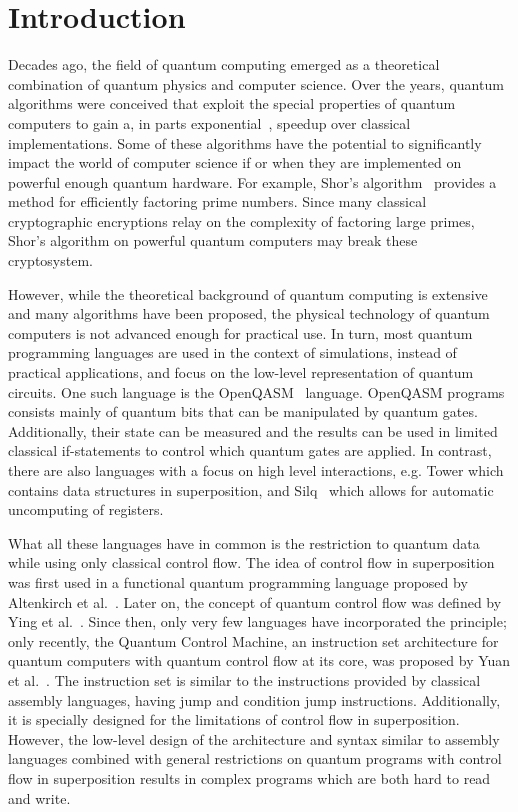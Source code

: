 \chapter{Introduction}
\label{ch:introduction}
Decades ago, the field of quantum computing emerged as a theoretical combination of quantum physics and computer science. Over the years, quantum algorithms were conceived that exploit the special properties of quantum computers to gain a, in parts exponential~\cite{BeVa93}, speedup over classical implementations. Some of these algorithms have the potential to significantly impact the world of computer science if or when they are implemented on powerful enough quantum hardware. For example, Shor's algorithm~\cite{Shor97} provides a method for efficiently factoring prime numbers. Since many classical cryptographic encryptions relay on the complexity of factoring large primes, Shor's algorithm on powerful quantum computers may break these cryptosystem.~\cite{DiCh20}

However, while the theoretical background of quantum computing is extensive and many algorithms have been proposed, the physical technology of quantum computers is not advanced enough for practical use. In turn, most quantum programming languages are used in the context of simulations, instead of practical applications, and focus on the low-level representation of quantum circuits. One such language is the OpenQASM~\cite{CBSG17} language. OpenQASM programs consists mainly of quantum bits that can be manipulated by quantum gates. Additionally, their state can be measured and the results can be used in limited classical if-statements to control which quantum gates are applied. In contrast, there are also languages with a focus on high level interactions, e.g. Tower\cite{ChMi22} which contains data structures in superposition, and Silq~\cite{BBGV20} which allows for automatic uncomputing of registers.

What all these languages have in common is the restriction to quantum data while using only classical control flow. The idea of control flow in superposition was first used in a functional quantum programming language proposed by Altenkirch et al.~\cite{AlGr05}. Later on, the concept of quantum control flow was defined by Ying et al.~\cite{YYF12}. Since then, only very few languages have incorporated the principle; only recently, the Quantum Control Machine, an instruction set architecture for quantum computers with quantum control flow at its core, was proposed by Yuan et al.~\cite{YVC24}. 
The instruction set is similar to the instructions provided by classical assembly languages, having jump and condition jump instructions. Additionally, it is specially designed for the limitations of control flow in superposition. However, the low-level design of the architecture and syntax similar to assembly languages combined with general restrictions on quantum programs with control flow in superposition results in complex programs which are both hard to read and write.     

